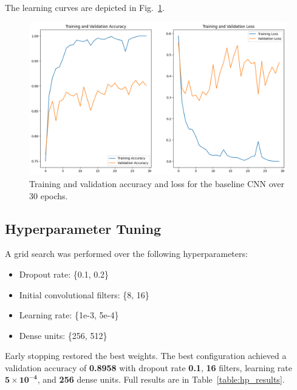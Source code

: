 \documentclass[conference]{IEEEtran}
\begin{document}
The learning curves are depicted in Fig.~\ref{fig:baseline_curves}.

\begin{figure}[htbp]
	\centerline{\includegraphics[width=\linewidth]{Images/baseline_curves.png}}
	\caption{Training and validation accuracy and loss for the baseline CNN over 30 epochs.}
	\label{fig:baseline_curves}
\end{figure}

\subsection{Hyperparameter Tuning}
A grid search was performed over the following hyperparameters:
\begin{itemize}
	\item Dropout rate: \{0.1, 0.2\}
	\item Initial convolutional filters: \{8, 16\}
	\item Learning rate: \{1e-3, 5e-4\}
	\item Dense units: \{256, 512\}
\end{itemize}

Early stopping restored the best weights. The best configuration achieved a validation accuracy of \textbf{0.8958} with dropout rate \textbf{0.1}, \textbf{16} filters, learning rate \(\mathbf{5\times10^{-4}}\), and \textbf{256} dense units. Full results are in Table~\ref{table:hp_results}.
\end{document}
